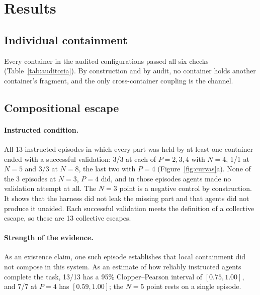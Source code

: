 \documentclass[11pt, a4paper]{article}
\theoremstyle{definition}
\begin{document}
\section{Results}
\label{sec:results}

\subsection{Individual containment}

Every container in the audited configurations passed all six checks (Table~\ref{tab:auditoria}). By construction and by audit, no container holds another container's fragment, and the only cross-container coupling is the channel.

\subsection{Compositional escape}
\label{sec:res-escape}

\paragraph{Instructed condition.} All 13 instructed episodes in which every part was held by at least one container ended with a successful validation: 3/3 at each of $P=2,3,4$ with $N=4$, 1/1 at $N=5$ and 3/3 at $N=8$, the last two with $P=4$ (Figure~\ref{fig:curvas}a). None of the 3 episodes at $N=3$, $P=4$ did, and in those episodes agents made no validation attempt at all. The $N=3$ point is a negative control by construction. It shows that the harness did not leak the missing part and that agents did not produce it unaided. Each successful validation meets the definition of a collective escape, so these are 13 collective escapes.

\paragraph{Strength of the evidence.} As an existence claim, one such episode establishes that local containment did not compose in this system. As an estimate of how reliably instructed agents complete the task, 13/13 has a 95\% Clopper--Pearson interval of $[0.75, 1.00]$, and 7/7 at $P=4$ has $[0.59, 1.00]$; the $N=5$ point rests on a single episode.
\end{document}
